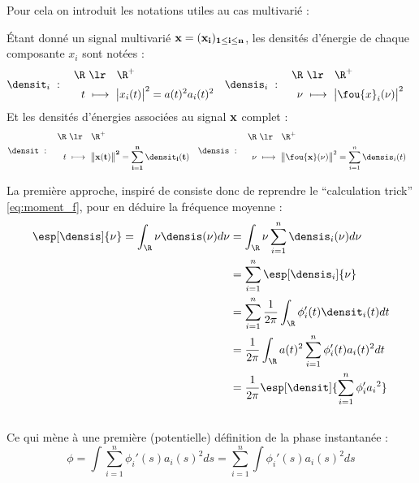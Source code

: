 Pour cela on introduit les notations utiles au cas multivarié :
\begin{definition}\label{def:densi_dE-mv}
	Étant donné un signal multivarié $\bf{x}=(x_i)_{1\leq i\leq n}$, les densités d'énergie de chaque composante $x_i$  sont notées :
	\begin{align}\label{eq:densi_dEi}
		\densit_i\ &:\quad \begin{aligned}\R\ &\lr\quad \R^+ \\ t\ &\longmapsto\ \big|x_i(t)\big|^2 = a(t)^2 a_i(t)^2 \end{aligned}  
		&
		\densis_i\ &:\quad \begin{aligned}\R\ &\lr\quad \R^+ \\ \nu\ &\longmapsto\ \big|\fou{x}_i(\nu)\big|^2 \end{aligned}
	\end{align}
	Et les densités d'énergies associées au signal $\bf{x}$ complet :
	\begin{align}\label{eq:densi_dE-mv}
		\densit\ &:\quad \begin{aligned}\R\ &\lr\quad \R^+ \\ t\ &\longmapsto\ \big\|\bf{x}(t)\big\|^2 = \sum_{i=1}^n \densit_i(t) \end{aligned}  
		&
		\densis\ &:\quad \begin{aligned}\R\ &\lr\quad \R^+ \\ \nu\ &\longmapsto\ \big\|\fou{\bf{x}}(\nu)\big\|^2 = \sum_{i=1}^n \densis_i(t) \end{aligned}	
	\end{align}
\end{definition}
\skipl

La première approche, inspiré de \cite{cano_mathematical_2022} consiste donc de reprendre le ``calculation trick'' \eqref{eq:moment_f}, pour en déduire la fréquence moyenne :
\begin{align*}
	\esp[\densis]{\nu} = \int_\R \nu\densis(\nu)d\nu &= \int_\R \nu\sum_{i=1}^n \densis_i(\nu) d\nu \\
	&= \sum_{i=1}^n\esp[\densis_i]{\nu} \\
	&= \sum_{i=1}^n\frac{1}{2\pi}\int_\R \phi_i'(t)\densit_i(t)dt \\
	&= \frac{1}{2\pi}\int_\R a(t)^2\sum_{i=1}^n\phi_i'(t)a_i(t)^2 dt 
	\\ &= \frac{1}{2\pi} \esp[\densit]{\sum_{i=1}^n \phi_i'{a_i}^2}
\end{align*}
\\
Ce qui mène à une première (potentielle) définition de la phase instantanée :
\begin{equation}\label{eq:phas_inst_v1}
	\phi = \int \sum_{i=1}^n \phi_i'(s){a_i}(s)^2ds 
	= \sum_{i=1}^n \int \phi_i'(s){a_i}(s)^2ds 
\end{equation}
\\

